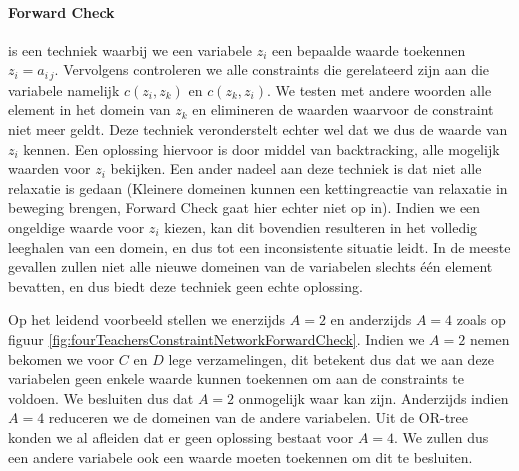 \paragraph{Forward Check}
 is een techniek waarbij we een variabele $z_i$ een bepaalde waarde toekennen $z_i=a_{i\,j}$. Vervolgens controleren we alle constraints die gerelateerd zijn aan die variabele namelijk $c\left(z_i,z_k\right)$ en $c\left(z_k,z_i\right)$. We testen met andere woorden alle element in het domein van $z_k$ en elimineren de waarden waarvoor de constraint niet meer geldt. Deze techniek veronderstelt echter wel dat we dus de waarde van $z_i$ kennen. Een oplossing hiervoor is door middel van backtracking, alle mogelijk waarden voor $z_i$ bekijken. Een ander nadeel aan deze techniek is dat niet alle relaxatie is gedaan (Kleinere domeinen kunnen een kettingreactie van relaxatie in beweging brengen, Forward Check gaat hier echter niet op in). Indien we een ongeldige waarde voor $z_i$ kiezen, kan dit bovendien resulteren in het volledig leeghalen van een domein, en dus tot een inconsistente situatie leidt. In de meeste gevallen zullen niet alle nieuwe domeinen van de variabelen slechts \'e\'en element bevatten, en dus biedt deze techniek geen echte oplossing.
\begin{leftbar}
Op het leidend voorbeeld stellen we enerzijds $A=2$ en anderzijds $A=4$ zoals op figuur \ref{fig:fourTeachersConstraintNetworkForwardCheck}. Indien we $A=2$ nemen bekomen we voor $C$ en $D$ lege verzamelingen, dit betekent dus dat we aan deze variabelen geen enkele waarde kunnen toekennen om aan de constraints te voldoen. We besluiten dus dat $A=2$ onmogelijk waar kan zijn. Anderzijds indien $A=4$ reduceren we de domeinen van de andere variabelen. Uit de OR-tree konden we al afleiden dat er geen oplossing bestaat voor $A=4$. We zullen dus een andere variabele ook een waarde moeten toekennen om dit te besluiten.
\end{leftbar}
